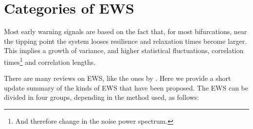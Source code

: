
\section{Categories of EWS}

Most early warning signals  are based on the fact that, for most bifurcations, near the tipping point the system looses resilience and relaxation times become larger. 
This implies a growth of variance, and higher statistical fluctuations, correlation times\footnote{And therefore change in the noise power spectrum.} and correlation lengths. 


There are many reviews on EWS, like the ones by \cite{Scheffer2009, dakos2012_10.1371/journal.pone.0041010,Lucarini2014, Clements2018a,Feudel2018,Boettiger2013,Dutta2018,Bury2020}. 
Here we provide a short update summary of the kinds of EWS that have been proposed.
The EWS can be divided in four groups, depending in the method used, as follows:
